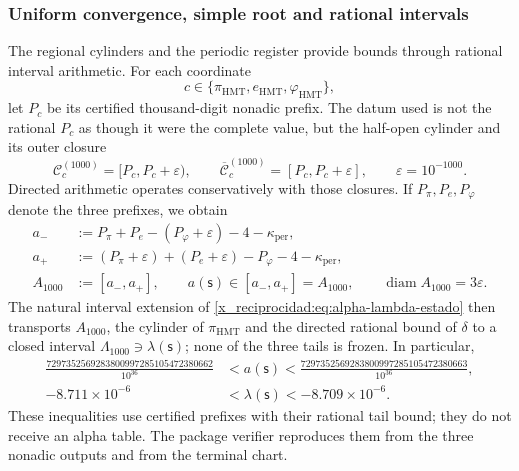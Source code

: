 \subsubsection{Uniform convergence, simple root and rational intervals}
\label{x_reciprocidad:subsec:alpha-cotas-completas-rev08}

The regional cylinders and the periodic register provide bounds through
rational interval arithmetic. For each coordinate
\[
 c\in\{\pi_{\mathrm{HMT}},e_{\mathrm{HMT}},\varphi_{\mathrm{HMT}}\},
\]
let \(P_c\) be its certified thousand-digit nonadic prefix. The datum used
is not the rational \(P_c\) as though it were the complete value, but the half-open
cylinder and its outer closure
\[
 \mathcal C_c^{(1000)}=[P_c,P_c+\varepsilon),
 \qquad
 \overline{\mathcal C}_c^{(1000)}=[P_c,P_c+\varepsilon],
 \qquad \varepsilon=10^{-1000}.
\]
Directed arithmetic operates conservatively with those closures. If
\(P_\pi,P_e,P_\varphi\) denote the three prefixes, we obtain
\begin{equation}
\begin{aligned}
 a_-&:=P_\pi+P_e-(P_\varphi+\varepsilon)-4-
       \kappa_{\mathrm{per}},\\
 a_+&:=(P_\pi+\varepsilon)+(P_e+\varepsilon)-P_\varphi-4-
       \kappa_{\mathrm{per}},\\
 A_{1000}&:=[a_-,a_+],
 \qquad a(\mathsf s)\in[a_-,a_+]=A_{1000},
 \qquad \operatorname{diam}A_{1000}=3\varepsilon.
\end{aligned}
\label{x_reciprocidad:eq:alpha-propagacion-colas-rev08}
\end{equation}
The natural interval extension of
\eqref{x_reciprocidad:eq:alpha-lambda-estado} then transports \(A_{1000}\), the cylinder
of \(\pi_{\mathrm{HMT}}\) and the directed rational bound of \(\delta\) to a
closed interval \(\Lambda_{1000}\ni\lambda(\mathsf s)\); none of the
three tails is frozen. In particular,
\begin{equation}
\begin{aligned}
 \frac{7297352569283800997285105472380662}{10^{36}}
 &<a(\mathsf s)<
 \frac{7297352569283800997285105472380663}{10^{36}},\\
 -8.711\mathbin{\times}10^{-6}
 &<\lambda(\mathsf s)<-8.709\mathbin{\times}10^{-6}.
\end{aligned}
 \label{x_reciprocidad:eq:alpha-cotas-precoordenada-lambda}
\end{equation}
These inequalities use certified prefixes with their rational tail
bound; they do not receive an alpha table. The package verifier reproduces them
from the three nonadic outputs and from the terminal chart.

